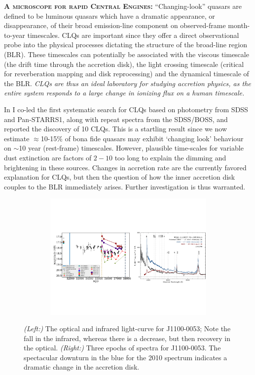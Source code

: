 \smallskip
\smallskip
\noindent
\textbf{\textsc{A microscope for rapid Central Engines:}}
``Changing-look'' quasars \citep[CLQs; ][]{LaMassa2015,
Runnoe2016, Ruan2016, Runco2016, MacLeod2016, Yang2017} 
are defined to be luminous quasars which have a
dramatic appearance, or disappearance, of their broad emission-line
component on observed-frame month-to-year timescales.  CLQs are
important since they offer a direct observational probe into the
physical processes dictating the structure of the broad-line region
(BLR). These timescales can potentially be associated with the viscous
timescale (the drift time through the accretion disk), the light
crossing timescale (critical for reverberation mapping and disk
reprocessing) and the dynamical timescale of the BLR.  {\it CLQs are thus
an ideal laboratory for studying accretion physics, as the entire
system responds to a large change in ionizing flux on a human
timescale.}

\smallskip 
\smallskip
\noindent 
In \citet{MacLeod2016} I co-led the first systematic search for CLQs
based on photometry from SDSS and Pan-STARRS1, along with repeat
spectra from the SDSS/BOSS, and reported the discovery of 10
CLQs. This is a startling result since we now estimate
$\approx$10-15\% of bona fide quasars may exhibit `changing look'
behaviour on $\sim$10 year (rest-frame) timescales. However, plausible
time-scales for variable dust extinction are factors of $2-10$ too
long to explain the dimming and brightening in these sources.  Changes
in accretion rate are the currently favored explanation for CLQs, but
then the question of how the inner accretion disk couples to the BLR
immediately arises. Further investigation is thus warranted.

\begin{figure}[h]
  \begin{center}
    \hspace{-0.5cm}
    \includegraphics[height=6.25cm,width=17.2cm]
    {figures/J110057_LC_Spectra_20171024.pdf}
    \vspace{-10pt}
    \caption{\footnotesize 
      {\it (Left:)} The optical and infrared light-curve for
      J1100-0053; Note the fall in the infrared, whereas there is a
      decrease, but then recovery in the optical.  {\it (Right:)} Three
      epochs of spectra for J1100-0053.  The spectacular downturn in the
      blue for the 2010 spectrum indicates a dramatic change in the
      accretion disk.}
    \vspace{-16pt}
    \label{fig:J1100}
  \end{center}
\end{figure}

